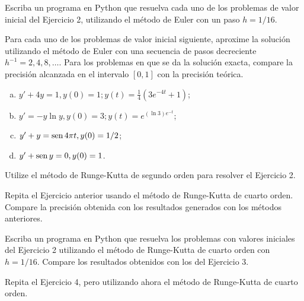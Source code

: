 \documentclass[11pt]{article}
\begin{document}
\begin{question} %
Escriba un programa en Python que resuelva cada uno de los problemas de valor inicial del Ejercicio 2, utilizando el método de Euler con un paso $h = 1/16$.
\end{question}


\begin{question} %
Para cada uno de los problemas de valor inicial siguiente, aproxime la solución utilizando el método de Euler con una secuencia de pasos decreciente $h^{-1} = 2, 4, 8, \ldots$. Para los problemas en que se da la solución exacta, compare la precisión alcanzada en el intervalo $[0, 1]$ con la precisión teórica.
\begin{enumerate}[a)]
    \item $y' + 4 y = 1, y(0) = 1; y(t) = \tfrac{1}{4}(3 e^{-4t} + 1)$;
    \item $y'= -y \ln y, y(0) = 3; y(t) = e^{(\ln 3) e^{-t}}$;
    \item $y' + y = \operatorname{sen} 4 \pi t, y(0) = 1/2$;
    \item $y' + \operatorname{sen} y = 0, y(0) = 1$.
\end{enumerate}
\end{question}


\begin{question} %
Utilize el método de Runge-Kutta de segundo orden para resolver el Ejercicio 2.
\end{question}

\begin{question} %
Repita el Ejercicio anterior usando el método de Runge-Kutta de cuarto orden. Compare la precisión obtenida con los resultados generados con los métodos anteriores.
\end{question}

\begin{question} %
Escriba un programa en Python que resuelva los problemas con valores iniciales del Ejercicio 2 utilizando el método de Runge-Kutta de cuarto orden con $h = 1/16$. Compare los resultados obtenidos con los del Ejercicio 3.
\end{question}

\begin{question} %
Repita el Ejercicio 4, pero utilizando ahora el método de Runge-Kutta de cuarto orden.
\end{question}
\end{document}

